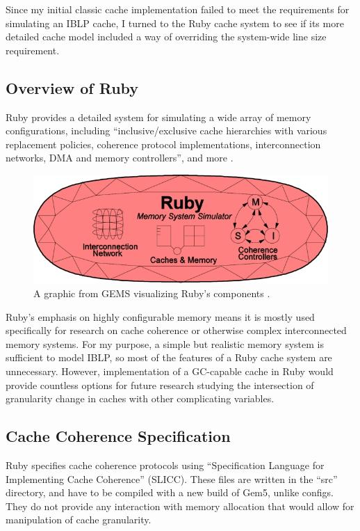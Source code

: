 \documentclass[12pt,twoside]{reedthesis}
\begin{document}
	Since my initial classic cache implementation failed to meet the requirements for simulating an IBLP cache, I turned to the Ruby cache system to see if its more detailed cache model included a way of overriding the system-wide line size requirement.

	\subsection*{Overview of Ruby}

	Ruby provides a detailed system for simulating a wide array of memory configurations, including ``inclusive/exclusive cache hierarchies with various replacement policies, coherence protocol implementations, interconnection networks, DMA and memory controllers'', and more \cite{gem5-ruby}.

	\begin{figure}[h]
		\centering
		\includegraphics[width=4.5in]{figures/ruby.jpg}
		\caption{A graphic from GEMS visualizing Ruby's components \cite{gem5-ruby}.}
	\end{figure}

	Ruby's emphasis on highly configurable memory means it is mostly used specifically for research on cache coherence or otherwise complex interconnected memory systems. For my purpose, a simple but realistic memory system is sufficient to model IBLP, so most of the features of a Ruby cache system are unnecessary. However, implementation of a GC-capable cache in Ruby would provide countless options for future research studying the intersection of granularity change in caches with other complicating variables.

	\subsection*{Cache Coherence Specification}

	Ruby specifies cache coherence protocols using ``Specification Language for Implementing Cache Coherence'' (SLICC). These files are written in the ``src'' directory, and have to be compiled with a new build of Gem5, unlike configs. They do not provide any interaction with memory allocation that would allow for manipulation of cache granularity.
\end{document}
